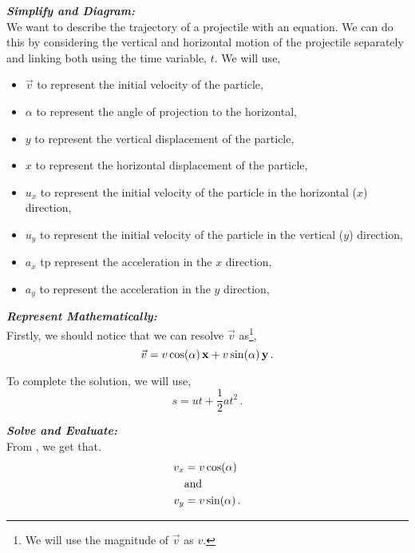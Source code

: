 \begin{subquestions}
\textbf{\textit{Simplify and Diagram:}} \\
We want to describe the trajectory of a projectile with an equation. We can do this by considering the vertical and horizontal motion of the projectile separately and linking both using the time variable, $t$. We will use,
\begin{itemize}
	\item $\vec{v}$ to represent the initial velocity of the particle,
	\item $\alpha$ to represent the angle of projection to the horizontal,
	\item $y$ to represent the vertical displacement of the particle,
	\item $x$ to represent the horizontal displacement of the particle,
	\item $u_x$ to represent the initial velocity of the particle in the horizontal ($x$) direction,
	\item $u_y$ to represent the initial velocity of the particle in the vertical ($y$) direction,
	\item $a_x$ tp represent the acceleration in the $x$ direction,
	\item $a_y$ to represent the acceleration in the $y$ direction,
\end{itemize}  




\textbf{\textit{Represent Mathematically:}} \\
Firstly, we should notice that we can resolve $\vec{v}$ as\footnote{We will use the magnitude of $\vec{v}$ as $v$.},
\begin{equation}
	\vec{v} = v\cos(\alpha)\,\mathbf{x} + v\sin(\alpha)\,\mathbf{y} \,. \label{2013:q6:Eqn1}
\end{equation}

To complete the solution, we will use,
\begin{equation}
	s = ut + \frac{1}{2}at^2 \,.
\end{equation}




\textbf{\textit{Solve and Evaluate:}} \\
From , we get that.
\begin{align}
	v_x & = v\cos(\alpha) \\
	& \text{and} \nonumber \\
	v_y & = v\sin(\alpha) \,.
\end{align} 


\end{subquestions}
